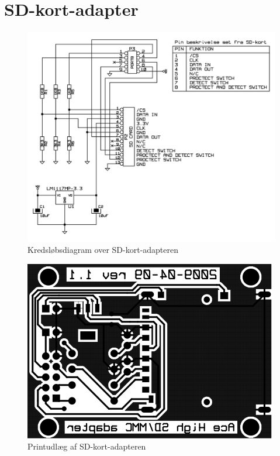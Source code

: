 \chapter{SD-kort-adapter}
\label{ch:b-sd}

\begin{figure}[htbp]
  \centering
  \includegraphics[width=\textwidth]{./img/sd-kort-adapter-diagram}
  \caption{Kredsløbsdiagram over SD-kort-adapteren}
  \label{fig:label-her}
\end{figure}


\begin{figure}[htbp]
  \centering
  \includegraphics{./img/sd-kort-adapter-kobber}
  \caption{Printudlæg af SD-kort-adapteren}
  \label{fig:label-her}
\end{figure}
